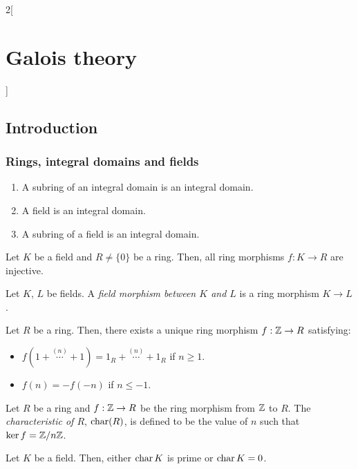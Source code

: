 \documentclass[../../../main.tex]{subfiles}
\begin{document}
\begin{multicols}{2}[\section{Galois theory}]
  \subsection{Introduction}
  \subsubsection{Rings, integral domains and fields}
  \begin{prop}
    \hfill
    \begin{enumerate}
      \item A subring of an integral domain is an integral domain.
      \item A field is an integral domain.
      \item A subring of a field is an integral domain.
    \end{enumerate}
  \end{prop}
  \begin{lemma}
    Let $K$ be a field and $R\ne\{0\}$ be a ring. Then, all ring morphisms $f:K\rightarrow R$ are injective.
  \end{lemma}
  \begin{definition}
    Let $K$, $L$ be fields. A \textit{field morphism between $K$ and $L$} is a ring morphism $K\rightarrow L$.
  \end{definition}
  \begin{lemma}
    Let $R$ be a ring. Then, there exists a unique ring morphism $f:\mathbb{Z}\rightarrow R$ satisfying:
    \begin{itemize}
      \item $f(1+\overset{(n)}{\cdots}+1)=1_R+\overset{(n)}{\cdots}+1_R$ if $n\geq 1$.
      \item $f(n)=-f(-n)$ if $n\leq -1$.
    \end{itemize}
  \end{lemma}
  \begin{definition}
    Let $R$ be a ring and $f:\mathbb{Z}\rightarrow R$ be the ring morphism from $\mathbb{Z}$ to $R$. The \textit{characteristic of $R$}, $\operatorname{char} (R)$, is defined to be the value of $n$ such that $\ker f=\quot{\ZZ}{n\ZZ}$.
  \end{definition}
  \begin{prop}
    Let $K$ be a field. Then, either $\operatorname{char} K$ is prime or $\operatorname{char} K=0$.

\end{prop}
\end{multicols}
\end{document}
